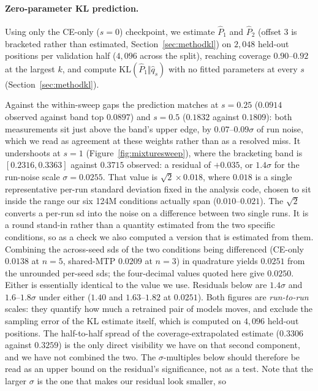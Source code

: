 \paragraph{Zero-parameter KL prediction.} Using only the CE-only ($s{=}0$)
checkpoint, we estimate $\hat{P}_1$ and $\hat{P}_2$ (offset 3 is bracketed rather than estimated, Section~\ref{sec:methodkl}) on $2{,}048$ held-out
positions per validation half ($4{,}096$ across the split), reaching coverage
$0.90$--$0.92$ at the largest $k$, and compute $\mathrm{KL}(\hat{P}_1 \Vert \hat{q}_s)$
with no fitted parameters at every $s$ (Section~\ref{sec:methodkl}).

Against the within-sweep gaps the prediction matches at $s{=}0.25$ ($0.0914$ observed
against band top $0.0897$) and $s{=}0.5$ ($0.1832$ against $0.1809$): both measurements
sit just above the band's upper edge, by $0.07$--$0.09\sigma$ of run noise, which we
read as agreement at these weights rather than as a resolved miss. It undershoots at
$s{=}1$ (Figure~\ref{fig:mixturesweep}), where the bracketing band is
$[0.2316, 0.3363]$ against $0.3715$ observed: a residual of $+0.035$, or $1.4\sigma$
for the run-noise scale $\sigma = 0.0255$. That value is $\sqrt{2} \times 0.018$, where $0.018$ is a single representative per-run standard deviation fixed in the analysis code, chosen to sit inside the range our six 124M conditions actually span ($0.010$--$0.021$). The $\sqrt{2}$ converts a per-run sd into the noise on a difference between two single runs. It is a round stand-in rather than a quantity estimated from the two specific conditions, so as a check we also computed a version that is estimated from them. Combining the across-seed sds of the two conditions being differenced (CE-only $0.0138$ at $n{=}5$, shared-MTP $0.0209$ at $n{=}3$) in quadrature yields $0.0251$ from the unrounded per-seed sds; the four-decimal values quoted here give $0.0250$. Either is essentially identical to the value we use. Residuals
below are $1.4\sigma$ and $1.6$--$1.8\sigma$ under either ($1.40$ and
$1.63$--$1.82$ at $0.0251$). Both figures are
\emph{run-to-run} scales: they quantify how much a retrained pair of models moves,
and exclude the sampling error of the KL estimate itself, which is computed on
$4{,}096$ held-out positions. The half-to-half spread of the coverage-extrapolated
estimate ($0.3306$ against $0.3259$) is the only direct visibility we have on that
second component, and we have not combined the two. The $\sigma$-multiples below
should therefore be read as an upper bound on the residual's significance, not as a
test. Note that the larger $\sigma$ is the one that makes our residual look smaller, so
